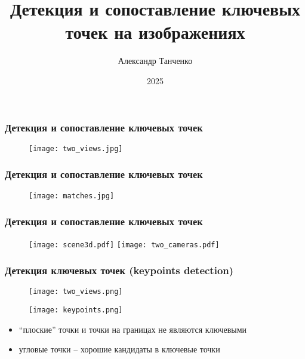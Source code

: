 \documentclass[12pt, usepdftitle=false, aspectratio=1610]{beamer}
\title[Лекция 5]{Детекция и сопоставление ключевых точек на изображениях}
\author{Александр Танченко}
\institute{}
\date{2025}
\begin{document}
\begin{frame}
    \titlepage
\end{frame}

\begin{frame}
\frametitle{Детекция и сопоставление ключевых точек}
\begin{figure}
    \centering
    \texttt{[image: two\_views.jpg]}
\end{figure}
\end{frame}

\begin{frame}
\frametitle{Детекция и сопоставление ключевых точек}
\begin{figure}
    \centering
    \texttt{[image: matches.jpg]}
\end{figure}
\end{frame}

\begin{frame}
\frametitle{Детекция и сопоставление ключевых точек}
\begin{figure}
    \centering
    \texttt{[image: scene3d.pdf]}
    \hspace{1cm}
    \texttt{[image: two\_cameras.pdf]}
\end{figure}
\end{frame}

\begin{frame}
\frametitle{Детекция ключевых точек (keypoints detection)}
\begin{figure}
    \centering
    \texttt{[image: two\_views.png]}
\end{figure}
\begin{figure}
    \centering
    \texttt{[image: keypoints.png]}
\end{figure}
\begin{itemize}
    \item ``плоские'' точки и точки на границах не являются ключевыми
    \item угловые точки -- хорошие кандидаты в ключевые точки
\end{itemize}
\end{frame}
\end{document}
